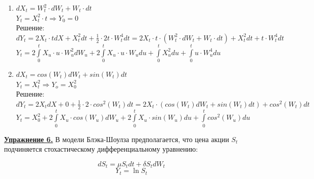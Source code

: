 \documentclass[a4paper]{article}
\begin{document}
\begin{enumerate}[label={\alph*)}]
\item $dX_t=W^{2}_{t}\cdot dW_t+W_t\cdot dt$\\

$Y_t=X^{2}_{t}\cdot t \Rightarrow Y_0=0$\\

Решение: $dY_t=2X_t\cdot tdX+X^{2}_{t}dt+\frac{1}{2}\cdot 2t\cdot W^{4}_{t}dt=2X_t\cdot t\cdot (W^{2}_{t}\cdot dW_t+W_t\cdot dt)+X^{2}_{t}dt+t\cdot W^{4}_{t}dt$\\

$Y_t=2\int\limits_{0}^{t}X_u\cdot u\cdot W^{2}_{u}dW_{u}+2\int\limits_{0}^{t}X_u\cdot u\cdot W_udu+\int\limits_{0}^{t}X^{2}_{u}du+\int\limits_{0}^{t}u\cdot W^{4}_{u}du$\\

\item $dX_t=cos(W_t)dW_t+sin(W_t)dt$\\

$Y_t=X^{2}_{t} \Rightarrow Y_o=X^{2}_{0}$\\

Решение: $dY_t=2X_tdX+0+\frac{1}{2}\cdot 2\cdot cos^2(W_t)dt=2X_t\cdot (cos(W_t)dW_t+sin(W_t)dt)+cos^2(W_t)dt$\\

$Y_t=X^{2}_{0}+2\int\limits_{0}^{t}X_u\cdot cos(W_u)dW_u+2\int\limits_{0}^{t}X_u\cdot sin(W_u)du+\int\limits_{0}^{t}cos^2(W_u)du$

\end{enumerate}

\par {\bf\underline{Упражнение 6.}} В модели Блэка-Шоулза предполагается, что цена акции $S_t$ подчиняется стохастическому дифференциальному уравнению:

$$dS_t=\mu S_tdt+\delta S_tdW_t$$
$$Y_t=\ln S_t$$
\end{document}
